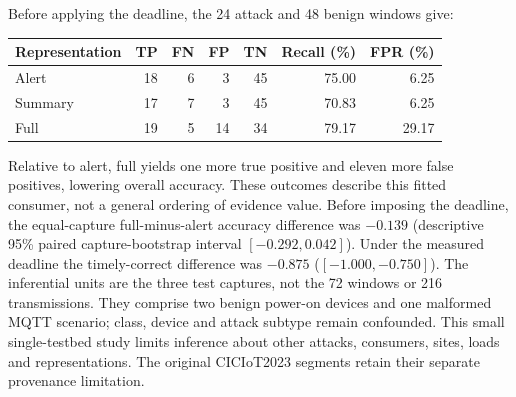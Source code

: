 \documentclass[10pt,onecolumn]{IEEEtran}
\begin{document}
Before applying the deadline, the 24 attack and 48 benign windows give:
\begin{center}\begin{tabular}{lrrrrrr}\toprule
Representation & TP & FN & FP & TN & Recall (\%) & FPR (\%)\\ \midrule
Alert & 18 & 6 & 3 & 45 & 75.00 & 6.25\\
Summary & 17 & 7 & 3 & 45 & 70.83 & 6.25\\
Full & 19 & 5 & 14 & 34 & 79.17 & 29.17\\
\bottomrule\end{tabular}\end{center}
Relative to alert, full yields one more true positive and eleven more false
positives, lowering overall accuracy. These outcomes
describe this fitted consumer, not a general ordering of evidence value.
Before imposing the deadline, the equal-capture full-minus-alert accuracy
difference was $-0.139$ (descriptive 95\%
paired capture-bootstrap interval $[-0.292,0.042]$). Under the measured
deadline the timely-correct difference was $-0.875$ ($[-1.000,-0.750]$). The inferential
units are the three test captures, not the 72 windows or 216 transmissions.
They comprise two benign power-on devices and one malformed MQTT scenario;
class, device and attack subtype remain confounded. This small single-testbed
study limits inference about other attacks, consumers, sites, loads and
representations. The original CICIoT2023 segments retain their separate
provenance limitation.
\end{document}
